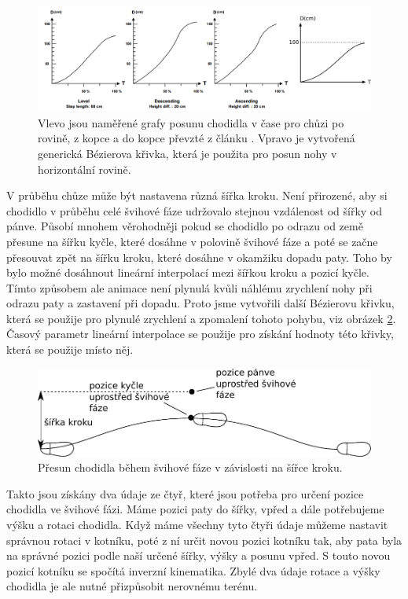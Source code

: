 \begin{figure}[h]
	\centering
	\includegraphics[width=1.0\linewidth]{fig/leg_swing_speed.pdf}
	\caption{Vlevo jsou naměřené grafy posunu chodidla v čase pro chůzi po rovině, z kopce a do kopce převzté z článku \cite{chung}. Vpravo je vytvořená generická Bézierova křivka, která je použita pro posun nohy v horizontální rovině.}
	\label{fig:swingSpeed}
\end{figure}

V průběhu chůze může být nastavena různá šířka kroku. Není přirozené, aby si chodidlo v průběhu celé švihové fáze udržovalo stejnou vzdálenost od šířky od pánve. Působí mnohem věrohodněji pokud se chodidlo po odrazu od země přesune na šířku kyčle, které dosáhne v polovině švihové fáze a poté se začne přesouvat zpět na šířku kroku, které dosáhne v okamžiku dopadu paty. Toho by bylo možné dosáhnout lineární interpolací mezi šířkou kroku a pozicí kyčle. Tímto způsobem ale animace není plynulá kvůli náhlému zrychlení nohy při odrazu paty a zastavení při dopadu. Proto jsme vytvořili další Bézierovu křivku, která se použije pro plynulé zrychlení a zpomalení tohoto pohybu, viz obrázek \ref{fig:widthStep}. Časový parametr lineární interpolace se použije pro získání hodnoty této křivky, která se použije místo něj.

\begin{figure}[h]
	\centering
	\includegraphics[width=0.7\linewidth]{fig/svih_sirka_kroku.pdf}
	\caption{Přesun chodidla během švihové fáze v závislosti na šířce kroku.}
	\label{fig:widthStep}
\end{figure}

Takto jsou získány dva údaje ze čtyř, které jsou potřeba pro určení pozice chodidla ve švihové fázi. Máme pozici paty do šířky, vpřed a dále potřebujeme výšku a rotaci chodidla. Když máme všechny tyto čtyři údaje můžeme nastavit správnou rotaci v kotníku, poté z ní určit novou pozici kotníku tak, aby pata byla na správné pozici podle naší určené šířky, výšky a posunu vpřed. S touto novou pozicí kotníku se spočítá inverzní kinematika. Zbylé dva údaje rotace a výšky chodidla je ale nutné přizpůsobit nerovnému terénu.


